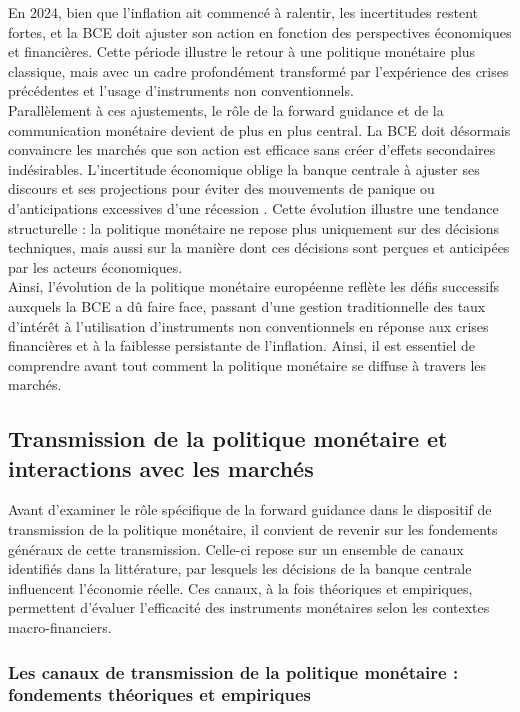 En 2024, bien que l’inflation ait commencé à ralentir, les incertitudes restent fortes, et la BCE doit ajuster son action en fonction des perspectives économiques et financières. Cette période illustre le retour à une politique monétaire plus classique, mais avec un cadre profondément transformé par l’expérience des crises précédentes et l’usage d’instruments non conventionnels.\\

Parallèlement à ces ajustements, le rôle de la forward guidance et de la communication monétaire devient de plus en plus central. La BCE doit désormais convaincre les marchés que son action est efficace sans créer d’effets secondaires indésirables. L’incertitude économique oblige la banque centrale à ajuster ses discours et ses projections pour éviter des mouvements de panique ou d’anticipations excessives d’une récession \citep{nakamura2018}. Cette évolution illustre une tendance structurelle : la politique monétaire ne repose plus uniquement sur des décisions techniques, mais aussi sur la manière dont ces décisions sont perçues et anticipées par les acteurs économiques.\\

Ainsi, l’évolution de la politique monétaire européenne reflète les défis successifs auxquels la BCE a dû faire face, passant d’une gestion traditionnelle des taux d’intérêt à l’utilisation d’instruments non conventionnels en réponse aux crises financières et à la faiblesse persistante de l’inflation. Ainsi, il est essentiel de comprendre avant tout comment la politique monétaire se diffuse à travers les marchés.

\subsection{Transmission de la politique monétaire et interactions avec les marchés}

Avant d’examiner le rôle spécifique de la forward guidance dans le dispositif de transmission de la politique monétaire, il convient de revenir sur les fondements généraux de cette transmission. Celle-ci repose sur un ensemble de canaux identifiés dans la littérature, par lesquels les décisions de la banque centrale influencent l’économie réelle. Ces canaux, à la fois théoriques et empiriques, permettent d’évaluer l'efficacité des instruments monétaires selon les contextes macro-financiers.

\subsubsection{Les canaux de transmission de la politique monétaire : fondements théoriques et empiriques}

